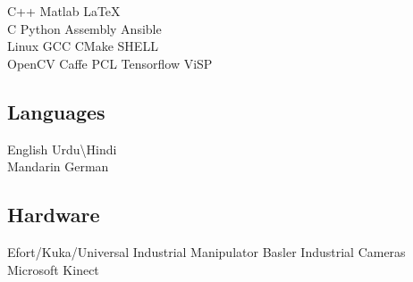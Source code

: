 \documentclass[a4paper]{deedy-resume} %
\begin{document}
\begin{minipage}[t]{0.33\textwidth}
C++ \textbullet{} Matlab \textbullet{} \LaTeX \\
C \textbullet{} Python \textbullet{} Assembly \textbullet{} Ansible \\
Linux \textbullet{} GCC \textbullet{} CMake \textbullet{} SHELL \\
OpenCV \textbullet{} Caffe \textbullet{} PCL \textbullet{} Tensorflow \textbullet{} ViSP \\

\vspace{\topsep} %

\subsection{Languages}
English \textbullet{} Urdu\textbackslash Hindi \\
Mandarin \textbullet {} German

\vspace{\topsep} %

\subsection{Hardware}
Efort/Kuka/Universal Industrial Manipulator \textbullet{} Basler Industrial Cameras \textbullet{} Microsoft Kinect \\

\end{minipage}
\end{document}
